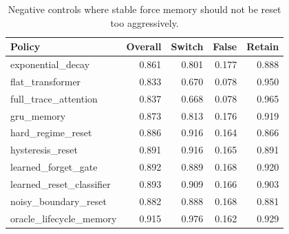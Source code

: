 \begin{table}[t]
\centering
\caption{Negative controls where stable force memory should not be reset too aggressively.}
\label{tab:negative-controls}
\small
\begin{tabular}{lrrrr}
\toprule
Policy & Overall & Switch & False & Retain \\
\midrule
exponential\_decay & 0.861 & 0.801 & 0.177 & 0.888 \\
flat\_transformer & 0.833 & 0.670 & 0.078 & 0.950 \\
full\_trace\_attention & 0.837 & 0.668 & 0.078 & 0.965 \\
gru\_memory & 0.873 & 0.813 & 0.176 & 0.919 \\
hard\_regime\_reset & 0.886 & 0.916 & 0.164 & 0.866 \\
hysteresis\_reset & 0.891 & 0.916 & 0.165 & 0.891 \\
learned\_forget\_gate & 0.892 & 0.889 & 0.168 & 0.920 \\
learned\_reset\_classifier & 0.893 & 0.909 & 0.166 & 0.903 \\
noisy\_boundary\_reset & 0.882 & 0.888 & 0.168 & 0.881 \\
oracle\_lifecycle\_memory & 0.915 & 0.976 & 0.162 & 0.929 \\
\bottomrule
\end{tabular}
\end{table}
